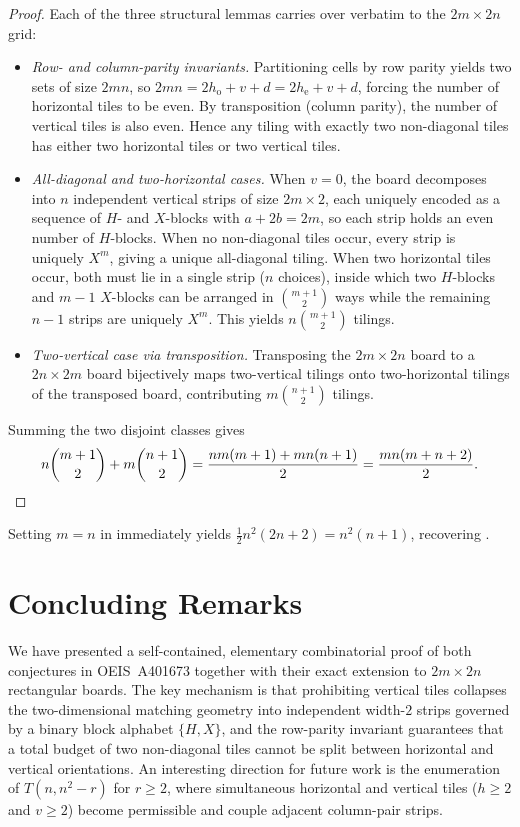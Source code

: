 \documentclass[11pt,a4paper]{article}
\theoremstyle{paperthm}
\theoremstyle{paperdef}
\begin{document}
\begin{proof}
  Each of the three structural lemmas carries over verbatim to the $2m \times 2n$ grid:
  \begin{itemize}
    \item \emph{Row- and column-parity invariants.} Partitioning cells by row parity yields two sets of size $2mn$, so $2mn = 2h_{\mathrm{o}} + v + d = 2h_{\mathrm{e}} + v + d$, forcing the number of horizontal tiles to be even. By transposition (column parity), the number of vertical tiles is also even. Hence any tiling with exactly two non-diagonal tiles has either two horizontal tiles or two vertical tiles.
    \item \emph{All-diagonal and two-horizontal cases.} When $v = 0$, the board decomposes into $n$ independent vertical strips of size $2m \times 2$, each uniquely encoded as a sequence of $H$- and $X$-blocks with $a + 2b = 2m$, so each strip holds an even number of $H$-blocks. When no non-diagonal tiles occur, every strip is uniquely $X^m$, giving a unique all-diagonal tiling. When two horizontal tiles occur, both must lie in a single strip ($n$ choices), inside which two $H$-blocks and $m-1$ $X$-blocks can be arranged in $\binom{m+1}{2}$ ways while the remaining $n-1$ strips are uniquely $X^m$. This yields $n\binom{m+1}{2}$ tilings.
    \item \emph{Two-vertical case via transposition.} Transposing the $2m \times 2n$ board to a $2n \times 2m$ board bijectively maps two-vertical tilings onto two-horizontal tilings of the transposed board, contributing $m\binom{n+1}{2}$ tilings.
  \end{itemize}
  Summing the two disjoint classes gives
  \[
    n\binom{m+1}{2} + m\binom{n+1}{2}
    = \frac{nm(m+1) + mn(n+1)}{2}
    = \frac{mn(m + n + 2)}{2}. \qedhere
  \]
\end{proof}

Setting $m = n$ in  immediately yields $\frac{1}{2}n^2(2n+2) = n^2(n+1)$, recovering .

\section{Concluding Remarks}

We have presented a self-contained, elementary combinatorial proof of both conjectures in OEIS~A401673 together with their exact extension to $2m \times 2n$ rectangular boards. The key mechanism is that prohibiting vertical tiles collapses the two-dimensional matching geometry into independent width-$2$ strips governed by a binary block alphabet $\{H, X\}$, and the row-parity invariant guarantees that a total budget of two non-diagonal tiles cannot be split between horizontal and vertical orientations. An interesting direction for future work is the enumeration of $T(n, n^2 - r)$ for $r \ge 2$, where simultaneous horizontal and vertical tiles ($h \ge 2$ and $v \ge 2$) become permissible and couple adjacent column-pair strips.
\end{document}
